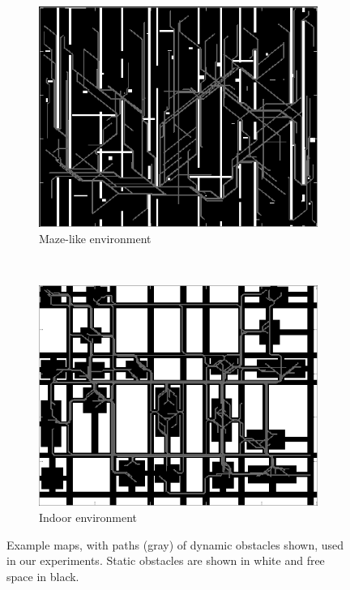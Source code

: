 \begin{figure}[ht]
  \centering
  \begin{subfigure}[t]{0.45\linewidth}
    \centering
    \includegraphics[width=\linewidth]{Figures/dyn.png}
    \caption{Maze-like environment}
  \end{subfigure}
  ~
  \begin{subfigure}[t]{0.45\linewidth}
    \centering
    \includegraphics[width=\linewidth]{Figures/indoor.png}
    \caption{Indoor environment}
  \end{subfigure}
  \caption{Example maps, with paths (gray) of dynamic obstacles shown, used in our experiments. Static obstacles are shown in white and free space in black.}
  \label{fig:env}
\end{figure}
 
